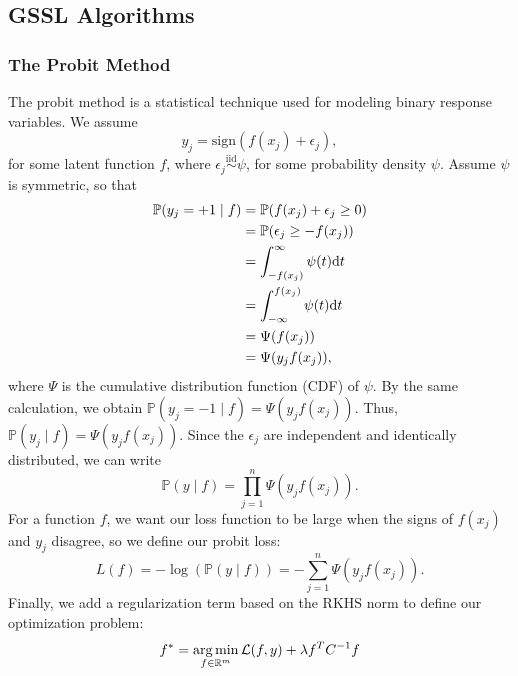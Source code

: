 \documentclass[12pt]{amsart}
\newcommand{\iid}{\overset{\mathrm{iid}}{\sim}}
\begin{document}
\subsection{GSSL Algorithms}
\subsubsection{The Probit Method}
The probit method is a statistical technique used for modeling binary response variables. We assume
\[y_j = \mathrm{sign}(f(x_j) + \epsilon_j),\]
for some latent function $f$, where $\epsilon_j\iid \psi$, for some probability density $\psi$. Assume $\psi$ is symmetric, so that
\begin{align*}
	\mathbb{P}(y_j = +1 \mid f) &= \mathbb{P}(f(x_j) + \epsilon_j \geq 0) \\
	&= \mathbb{P}(\epsilon_j \geq - f(x_j)  ) \\
	&= \int_{-f(x_j)}^\infty \psi(t) {\mathrm{d}} t \\
	&= \int_{-\infty}^{f(x_j)} \psi(t) {\mathrm{d}} t \\
	&= \Psi(f(x_j)) \\
	&= \Psi(y_jf(x_j)),
\end{align*}
where $\Psi$ is the cumulative distribution function (CDF) of $\psi$. By the same calculation, we obtain $\mathbb{P}(y_j = -1 \mid f) = \Psi(y_jf(x_j))$. Thus, $\mathbb{P}(y_j \mid f) = \Psi(y_jf(x_j))$. Since the $\epsilon_j$ are independent and identically distributed, we can write
\[\mathbb{P}(y  \mid f) = \prod_{j = 1}^n \Psi(y_jf(x_j)).\]
For a function $f$, we want our loss function to be large when the signs of $f(x_j)$ and $y_j$  disagree, so we define our probit loss:
\[L(f) = -\log(\mathbb{P}(y\mid f)) = -\sum_{j = 1}^n \Psi(y_jf(x_j)).\]
Finally, we add a regularization term based on the RKHS norm to define our optimization problem:
\[f^* = \operatorname*{arg\,min}_{f \in \mathbb{R}^{m}} \mathcal{L}(f,y) + \lambda f^{T}C^{-1}f\]
\end{document}
